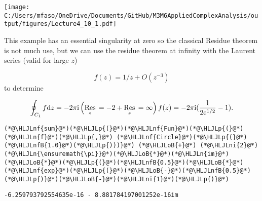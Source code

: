 \documentclass[12pt,a4paper]{article}
\newcommand{\HLJLn}[1]{#1}
\newcommand{\HLJLnf}[1]{\textcolor[RGB]{66,102,213}{#1}}
\newcommand{\HLJLnfB}[1]{\textcolor[RGB]{59,151,46}{#1}}
\newcommand{\HLJLni}[1]{\textcolor[RGB]{59,151,46}{#1}}
\newcommand{\HLJLoB}[1]{\textcolor[RGB]{102,102,102}{\textbf{#1}}}
\newcommand{\HLJLp}[1]{#1}
\def\D{ {\rm d} }
\def\I{ {\rm i} }
\def\E{ {\rm e} }
\def\Res_#1{\underset{#1}{\rm Res}\,}
\def\pr(#1){\left({#1}\right)}
\begin{document}
\texttt{[image: C:/Users/mfaso/OneDrive/Documents/GitHub/M3M6AppliedComplexAnalysis/output/figures/Lecture4\_10\_1.pdf]}

This example has an essential singularity at zero so the classical Residue theorem is not much use, but we can use the residue theorem at infinity with the Laurent series (valid for large $z$)

\[
f(z) = 1/z + O(z^{-3})
\]
to determine

\[
\oint_{C_1} f \D z = - 2\pi \I \pr(\Res_{z=-2} + \Res_{z = \infty}) f(z) = -2 \pi \I ({1 \over 2 \E^{1/2}} - 1).
\]

\begin{lstlisting}
(*@\HLJLnf{sum}@*)(*@\HLJLp{(}@*)(*@\HLJLnf{Fun}@*)(*@\HLJLp{(}@*)(*@\HLJLn{f}@*)(*@\HLJLp{,}@*) (*@\HLJLnf{Circle}@*)(*@\HLJLp{(}@*)(*@\HLJLnfB{1.0}@*)(*@\HLJLp{)))}@*) (*@\HLJLoB{+}@*) (*@\HLJLni{2}@*)(*@\HLJLn{\ensuremath{\pi}}@*)(*@\HLJLoB{*}@*)(*@\HLJLn{im}@*)(*@\HLJLoB{*}@*)(*@\HLJLp{(}@*)(*@\HLJLnfB{0.5}@*)(*@\HLJLoB{*}@*)(*@\HLJLnf{exp}@*)(*@\HLJLp{(}@*)(*@\HLJLoB{-}@*)(*@\HLJLnfB{0.5}@*)(*@\HLJLp{)}@*)(*@\HLJLoB{-}@*)(*@\HLJLni{1}@*)(*@\HLJLp{)}@*)
\end{lstlisting}

\begin{lstlisting}
-6.259793792554635e-16 - 8.881784197001252e-16im
\end{lstlisting}
\end{document}
